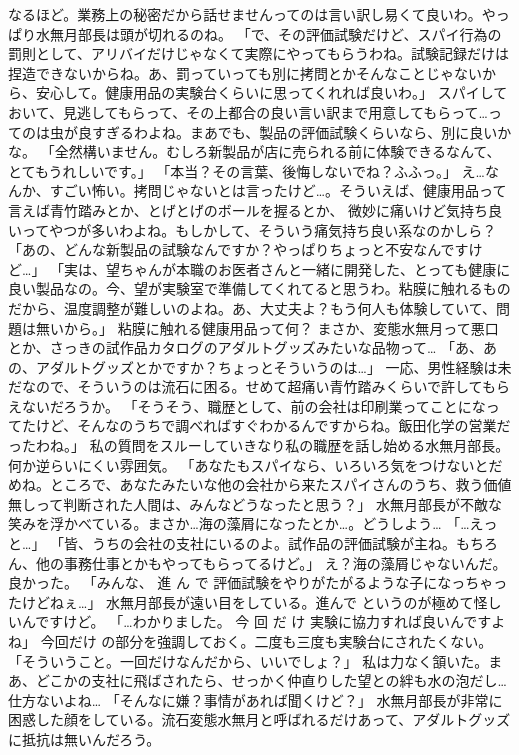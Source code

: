 なるほど。業務上の秘密だから話せませんってのは言い訳し易くて良いわ。やっぱり水無月部長は頭が切れるのね。
「で、その評価試験だけど、スパイ行為の罰則として、アリバイだけじゃなくて実際にやってもらうわね。試験記録だけは捏造できないからね。あ、罰っていっても別に拷問とかそんなことじゃないから、安心して。健康用品の実験台くらいに思ってくれれば良いわ。」
スパイしておいて、見逃してもらって、その上都合の良い言い訳まで用意してもらって…ってのは虫が良すぎるわよね。まあでも、製品の評価試験くらいなら、別に良いかな。
「全然構いません。むしろ新製品が店に売られる前に体験できるなんて、とてもうれしいです。」
「本当？その言葉、後悔しないでね？ふふっ。」
え…なんか、すごい怖い。拷問じゃないとは言ったけど…。そういえば、健康用品って言えば青竹踏みとか、とげとげのボールを握るとか、
微妙に痛いけど気持ち良いってやつが多いわよね。もしかして、そういう痛気持ち良い系なのかしら？
「あの、どんな新製品の試験なんですか？やっぱりちょっと不安なんですけど…」
「実は、望ちゃんが本職のお医者さんと一緒に開発した、とっても健康に良い製品なの。今、望が実験室で準備してくれてると思うわ。粘膜に触れるものだから、温度調整が難しいのよね。あ、大丈夫よ？もう何人も体験していて、問題は無いから。」
粘膜に触れる健康用品って何？
まさか、変態水無月って悪口とか、さっきの試作品カタログのアダルトグッズみたいな品物って…
「あ、あの、アダルトグッズとかですか？ちょっとそういうのは…」
一応、男性経験は未だなので、そういうのは流石に困る。せめて超痛い青竹踏みくらいで許してもらえないだろうか。
「そうそう、職歴として、前の会社は印刷業ってことになってたけど、そんなのうちで調べればすぐわかるんですからね。飯田化学の営業だったわね。」
私の質問をスルーしていきなり私の職歴を話し始める水無月部長。何か逆らいにくい雰囲気。
「あなたもスパイなら、いろいろ気をつけないとだめね。ところで、あなたみたいな他の会社から来たスパイさんのうち、救う価値無しって判断された人間は、みんなどうなったと思う？」
水無月部長が不敵な笑みを浮かべている。まさか…海の藻屑になったとか…。どうしよう…
「…えっと…」
「皆、うちの会社の支社にいるのよ。試作品の評価試験が主ね。もちろん、他の事務仕事とかもやってもらってるけど。」
え？海の藻屑じゃないんだ。良かった。
「みんな、 進 ん で 評価試験をやりがたがるような子になっちゃったけどねぇ…」
水無月部長が遠い目をしている。進んで というのが極めて怪しいんですけど。
「…わかりました。 今 回 だ け 実験に協力すれば良いんですよね」
今回だけ の部分を強調しておく。二度も三度も実験台にされたくない。
「そういうこと。一回だけなんだから、いいでしょ？」
私は力なく頷いた。まあ、どこかの支社に飛ばされたら、せっかく仲直りした望との絆も水の泡だし…仕方ないよね…
「そんなに嫌？事情があれば聞くけど？」
水無月部長が非常に困惑した顔をしている。流石変態水無月と呼ばれるだけあって、アダルトグッズに抵抗は無いんだろう。
